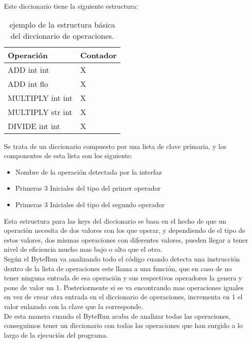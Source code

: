Este diccionario tiene la siguiente estructura:\\

\begin{table}[htbp]
\begin{center}
\begin{tabular}{|l|l|}
\hline
Operación & Contador \\
\hline \hline
ADD int int & X \\ \hline
ADD int flo & X \\ \hline
MULTIPLY int int & X \\ \hline
MULTIPLY str int & X \\ \hline
DIVIDE int int & X \\ \hline
\end{tabular}
\caption{ejemplo de la estructura básica del diccionario de operaciones.}

\label{tabla:sencilla}
\end{center}
\end{table}
Se trata de un diccionario compuesto por una lista de clave primaria, y los componentes de esta lista son los siguiente:
\begin{itemize}
	\item Nombre de la operación detectada por la interfaz
	\item Primeras 3 Iniciales del tipo del primer operador 
	\item Primeras 3 Iniciales del tipo del segundo operador 
\end{itemize}




Esta estructura para las keys del diccionario se basa en el hecho de que un operación necesita de dos valores con los que operar, y dependiendo de el tipo de estos valores, dos mismas operaciones con diferentes valores, pueden llegar a tener nivel de eficiencia mucho mas bajo o alto que el otro. \\

Según el ByteRun va analizando todo el código cuando detecta una instrucción dentro de la lista de operaciones este llama a una función, que en caso de no tener ninguna entrada de esa operación y sus respectivos operadores la genera y pone de valor un 1. Posteriormente si se va encontrando mas operaciones iguales en vez de crear otra entrada en el diccionario de operaciones, incrementa en 1 el valor enlazado con la clave que la corresponde.\\

De esta manera cuando el ByteRun acaba de analizar todas las operaciones, conseguimos tener un diccionario con todas las operaciones que han surgido a lo largo de la ejecución del programa.\\

